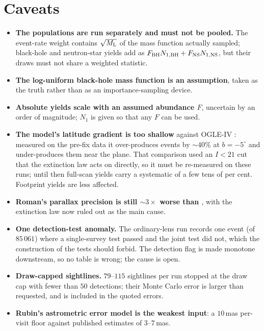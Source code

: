 \documentclass[english,10pt,a4paper]{article}
\newcommand{\Ml}{M_{\rm L}}
\begin{document}
\section{Caveats}

\begin{itemize}
\item \textbf{The populations are run separately and must not be pooled.} The event-rate weight
      contains $\sqrt{\Ml}$ of the mass function actually sampled; black-hole and neutron-star
      yields add as $F_{\rm BH}N_{1,\rm BH}+F_{\rm NS}N_{1,\rm NS}$, but their draws must not share
      a weighted statistic.
\item \textbf{The log-uniform black-hole mass function is an assumption}, taken as the truth
      rather than as an importance-sampling device.
\item \textbf{Absolute yields scale with an assumed abundance $F$}, uncertain by an order of
      magnitude; $N_1$ is given so that any $F$ can be used.
\item \textbf{The model's latitude gradient is too shallow} against OGLE-IV \citep{Mroz2019}:
      measured on the pre-fix data it over-produces events by $\sim\!40\%$ at $b=-5^\circ$ and
      under-produces them near the plane. That comparison used an $I<21$ cut that the extinction
      law acts on directly, so it must be re-measured on these runs; until then full-scan yields
      carry a systematic of a few tens of per cent. Footprint yields are less affected.
\item \textbf{Roman's parallax precision is still $\sim\!3\times$ worse than
      \citet{SajadianSahu2023}}, with the extinction law now ruled out as the main cause.
\item \textbf{One detection-test anomaly.} The ordinary-lens run records one event (of $85\,061$)
      where a single-survey test passed and the joint test did not, which the construction of the
      tests should forbid. The detection flag is made monotone downstream, so no table is wrong;
      the cause is open.
\item \textbf{Draw-capped sightlines.} $79$--$115$ sightlines per run stopped at the draw cap with
      fewer than $50$ detections; their Monte Carlo error is larger than requested, and is
      included in the quoted errors.
\item \textbf{Rubin's astrometric error model is the weakest input}: a $10$\,mas per-visit floor
      against published estimates of $3$--$7$\,mas.
\end{itemize}
\end{document}
